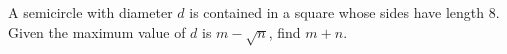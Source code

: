 A semicircle with diameter $d$ is contained in a square whose sides have length $8$. Given the maximum value of $d$ is $m- \sqrt{n}$, find $m+n$.